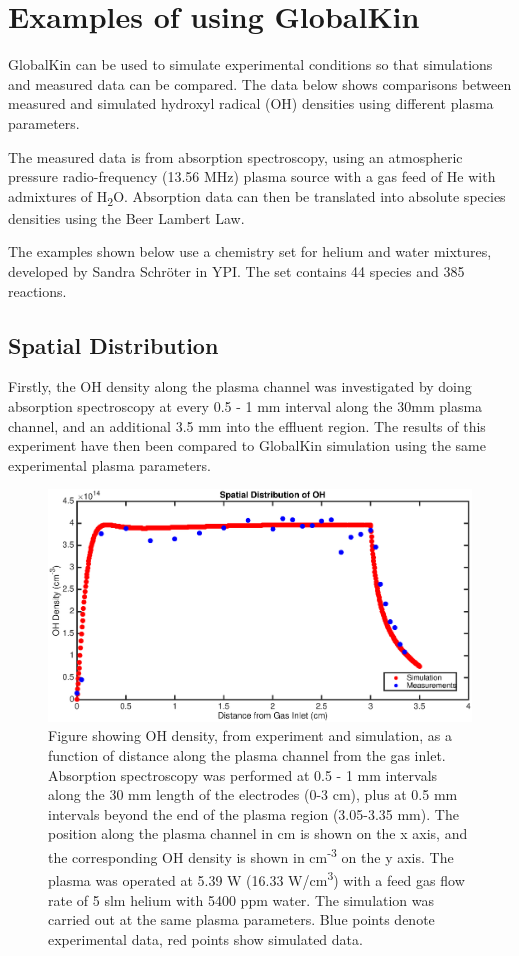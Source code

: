 \documentclass[11pt, oneside]{article}   	%
\begin{document}
\section*{Examples of using GlobalKin}

GlobalKin can be used to simulate experimental conditions so that simulations and measured data can be compared.
The data below shows comparisons between measured and simulated hydroxyl radical (OH) densities using different plasma parameters.

The measured data is from absorption spectroscopy, using an atmospheric pressure radio-frequency (13.56 MHz) plasma source with a gas feed of He with admixtures of H\textsubscript{2}O.
Absorption data can then be translated into absolute species densities using the Beer Lambert Law.

The examples shown below use a chemistry set for helium and water mixtures, developed by Sandra Schr\"oter in YPI.
The set contains 44 species and 385 reactions.

\subsection*{Spatial Distribution}

Firstly, the OH density along the plasma channel was investigated by doing absorption spectroscopy at every 0.5 - 1 mm interval along the 30mm plasma channel, and an additional 3.5 mm into the effluent region.
The results of this experiment have then been compared to GlobalKin simulation using the same experimental plasma parameters.

\begin{figure}
\includegraphics[width=\textwidth]{Figures/SpatialGraph}
\caption{
Figure showing OH density, from experiment and simulation, as a function of distance along the plasma channel from the gas inlet. Absorption spectroscopy was performed at 0.5 - 1 mm intervals along the 30 mm length of the electrodes (0-3 cm), plus at 0.5 mm intervals beyond the end of the plasma region (3.05-3.35 mm). The position along the plasma channel in cm is shown on the x axis, and the corresponding OH density is shown in cm\textsuperscript{-3} on the y axis. The plasma was operated at 5.39 W (16.33 W/cm\textsuperscript{3}) with a feed gas flow rate of 5 slm helium with 5400 ppm water. 
The simulation was carried out at the same plasma parameters.
Blue points denote experimental data, red points show simulated data.}
\label{SpatialGraph}
\end{figure}
\end{document}
